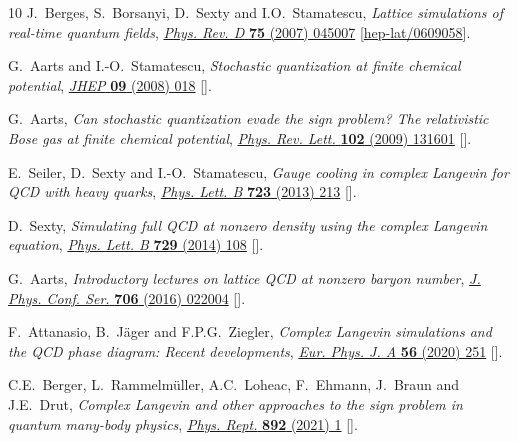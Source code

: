 \begin{thebibliography}{10}
J.~Berges, S.~Borsanyi, D.~Sexty and I.O.~Stamatescu, \emph{{Lattice
  simulations of real-time quantum fields}},
  \href{https://doi.org/10.1103/PhysRevD.75.045007}{\emph{Phys. Rev. D}
  {\bfseries 75} (2007) 045007}
  [\href{https://arxiv.org/abs/hep-lat/0609058}{{\ttfamily hep-lat/0609058}}].

G.~Aarts and I.-O.~Stamatescu, \emph{{Stochastic quantization at finite
  chemical potential}},
  \href{https://doi.org/10.1088/1126-6708/2008/09/018}{\emph{JHEP} {\bfseries
  09} (2008) 018} [\href{https://arxiv.org/abs/0807.1597}{{}}].

G.~Aarts, \emph{{Can stochastic quantization evade the sign problem? The
  relativistic Bose gas at finite chemical potential}},
  \href{https://doi.org/10.1103/PhysRevLett.102.131601}{\emph{Phys. Rev. Lett.}
  {\bfseries 102} (2009) 131601}
  [\href{https://arxiv.org/abs/0810.2089}{{}}].

E.~Seiler, D.~Sexty and I.-O.~Stamatescu, \emph{{Gauge cooling in complex
  Langevin for QCD with heavy quarks}},
  \href{https://doi.org/10.1016/j.physletb.2013.04.062}{\emph{Phys. Lett. B}
  {\bfseries 723} (2013) 213}
  [\href{https://arxiv.org/abs/1211.3709}{{}}].

D.~Sexty, \emph{{Simulating full QCD at nonzero density using the complex
  Langevin equation}},
  \href{https://doi.org/10.1016/j.physletb.2014.01.019}{\emph{Phys. Lett. B}
  {\bfseries 729} (2014) 108}
  [\href{https://arxiv.org/abs/1307.7748}{{}}].

G.~Aarts, \emph{{Introductory lectures on lattice QCD at nonzero baryon
  number}}, \href{https://doi.org/10.1088/1742-6596/706/2/022004}{\emph{J.
  Phys. Conf. Ser.} {\bfseries 706} (2016) 022004}
  [\href{https://arxiv.org/abs/1512.05145}{{}}].

F.~Attanasio, B.~J\"ager and F.P.G.~Ziegler, \emph{{Complex Langevin
  simulations and the QCD phase diagram: Recent developments}},
  \href{https://doi.org/10.1140/epja/s10050-020-00256-z}{\emph{Eur. Phys. J. A}
  {\bfseries 56} (2020) 251}
  [\href{https://arxiv.org/abs/2006.00476}{{}}].

C.E.~Berger, L.~Rammelm\"uller, A.C.~Loheac, F.~Ehmann, J.~Braun and J.E.~Drut,
  \emph{{Complex Langevin and other approaches to the sign problem in quantum
  many-body physics}},
  \href{https://doi.org/10.1016/j.physrep.2020.09.002}{\emph{Phys. Rept.}
  {\bfseries 892} (2021) 1} [\href{https://arxiv.org/abs/1907.10183}{{}}].


\end{thebibliography}
